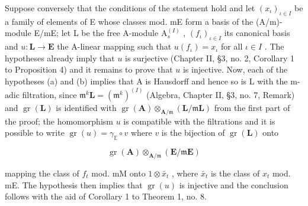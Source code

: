 Suppose conversely that the conditions of the statement hold and let \((x_{\iota})_{\iota \in I}\) be a family of elements of E whose classes mod. mE form a basis of the (A/m)-module E/mE; let L be the free A-module \(\mathrm{A}_s^{(I)}\) , \((f_{\iota})_{\iota \in I}\) its canonical basis and \(u: \mathbf{L} \to \mathbf{E}\) the A-linear mapping such that \(u(f_{\iota}) = x_{\iota}\) for all \(\iota \in I\) . The hypotheses already imply that \(u\) is surjective (Chapter II, §3, no. 2, Corollary 1 to Proposition 4) and it remains to prove that \(u\) is injective. Now, each of the hypotheses (a) and (b) implies that A is Hausdorff and hence so is L with the m-adic filtration, since \(\mathfrak{m}^k\mathbf{L} = (\mathfrak{m}^k)^{(I)}\) (Algebra, Chapter II, §3, no. 7, Remark) and \(\operatorname{gr}(\mathbf{L})\) is identified with \(\operatorname{gr}(\mathbf{A}) \otimes_{\mathbf{A} / \mathfrak{m}} (\mathbf{L} / \mathfrak{m}\mathbf{L})\) from the first part of the proof; the homomorphism \(u\) is compatible with the filtrations and it is possible to write \(\operatorname{gr}(u) = \gamma_{\mathbb{E}} \circ v\) where \(v\) is the bijection of \(\operatorname{gr}(\mathbf{L})\) onto

\[
\operatorname{gr} (\mathbf {A}) \otimes_ {\mathbf {A} / \mathfrak {m}} (\mathbf {E} / \mathfrak {m} \mathbf {E})
\]

mapping the class of \(f_{t}\) mod. mM onto \(1 \otimes \bar{x}_{t}\) , where \(\bar{x}_{t}\) is the class of \(x_{t}\) mod. mE. The hypothesis then implies that \(\operatorname{gr}(u)\) is injective and the conclusion follows with the aid of Corollary 1 to Theorem 1, no. 8.

